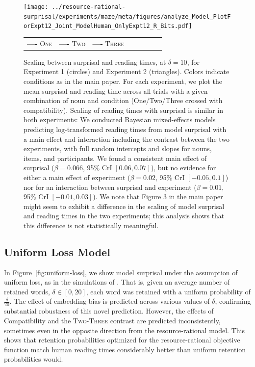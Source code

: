 \begin{figure}
    \centering


    \texttt{[image: ../resource-rational-surprisal/experiments/maze/meta/figures/analyze\_Model\_PlotForExpt12\_Joint\_ModelHuman\_OnlyExpt12\_R\_Bits.pdf]}

        \begin{tabular}{llllllll}
\textbf{\textcolor{one}{----}} \textsc{One}&
\textbf{\textcolor{two}{----}} \textsc{Two}&
\textbf{\textcolor{three}{----}} \textsc{Three}
\end{tabular}
 
	\caption{Scaling between surprisal and reading times, at $\delta=10$, for Experiment 1 (circles) and Experiment 2 (triangles). Colors indicate conditions as in the main paper. For each experiment, we plot the mean surprisal and reading time across all trials with a given combination of noun and condition (One/Two/Three crossed with compatibility).
	Scaling of reading times with surprisal is similar in both experiments:
	We conducted Bayesian mixed-effects models predicting log-transformed reading times from model surprisal with a main effect and interaction including the contrast between the two experiments, with full random intercepts and slopes for nouns, items, and participants.
	We found a consistent main effect of surprisal ($\beta=0.066$, 95\% CrI $[0.06, 0.07]$), but no evidence for either a main effect of experiment ($\beta=0.02$, 95\% CrI $[-0.05, 0.1]$) nor for an interaction between surprisal and experiment ($\beta=0.01$, 95\% CrI $[-0.01,0.03]$).
We note that Figure 3 in the main paper might seem to exhibit a difference in the scaling of model surprisal and reading times in the two experiments; this analysis shows that this difference is not statistically meaningful.
		}
    \label{fig:fit-critical-scaling-dots}
\end{figure}



\subsection{Uniform Loss Model}

In Figure~\ref{fig:uniform-loss}, we show model surprisal under the assumption of uniform loss, as in the simulations of \citet{Futrell2020LossyContextSA}.
That is, given an average number of retained words, $\delta \in [0,20]$, each word was retained with a uniform probability of $\frac{\delta}{20}$.
The effect of embedding bias is predicted across various values of $\delta$, confirming substantial robustness of this novel prediction.
However, the effects of Compatibility and the \textsc{Two}-\textsc{Three} contrast are predicted inconsistently, sometimes even in the opposite direction from the resource-rational model.
This shows that retention probabilities optimized for the resource-rational objective function match human reading times considerably better than uniform retention probabilities would.


